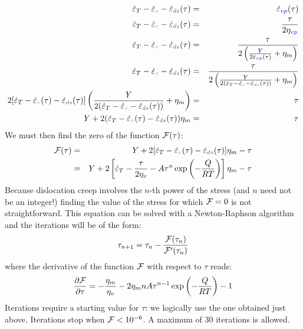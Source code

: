 \begin{enumerate}
\begin{eqnarray}
\dot\varepsilon_T 
-\dot{\varepsilon}_{\color{orange}v} 
-\dot{\varepsilon}_{\color{OliveGreen}ds}(\tau) 
&=& \dot\varepsilon_{\color{blue}vp}(\tau)  \nonumber\\
\dot\varepsilon_T 
-\dot{\varepsilon}_{\color{orange}v} 
-\dot{\varepsilon}_{\color{OliveGreen}ds}(\tau) 
&=& \frac{\tau}{2 \eta_{\color{blue}vp}}  \nn\\
\dot\varepsilon_T 
-\dot{\varepsilon}_{\color{orange}v} 
-\dot{\varepsilon}_{\color{OliveGreen}ds}(\tau) 
&=& \frac{\tau}{2 \left( \frac{Y}{2\dot\varepsilon_{\color{blue}vp}(\tau)} + \eta_m  \right)} 
\nonumber\\
\dot\varepsilon_T 
-\dot{\varepsilon}_{\color{orange}v} 
-\dot{\varepsilon}_{\color{OliveGreen}ds}(\tau) 
&=&
\frac{\tau}{2 \left( \frac{Y}{2 (
\dot\varepsilon_T 
-\dot{\varepsilon}_{\color{orange}v}   
-\dot{\varepsilon}_{\color{OliveGreen}ds}(\tau)  )} + \eta_m  \right)} \nonumber 
\\
2 [
\dot\varepsilon_T 
-\dot{\varepsilon}_{\color{orange}v}(\tau) 
-\dot{\varepsilon}_{\color{OliveGreen}ds}(\tau)
]
\left( \frac{Y}{2 (
\dot\varepsilon_T 
-\dot{\varepsilon}_{\color{orange}v} 
-\dot{\varepsilon}_{\color{OliveGreen}ds}(\tau) )} + \eta_m  \right) &=& \tau 
\nonumber\\
Y + 2 (
\dot\varepsilon_T 
-\dot{\varepsilon}_{\color{orange}v}(\tau)  
-\dot{\varepsilon}_{\color{OliveGreen}ds}(\tau) ) \eta_m  &=& \tau \nonumber 
\end{eqnarray}
We must then find the zero of the function ${\cal F}(\tau)$: 
\begin{eqnarray}
{\cal F}(\tau) 
&=& Y + 2 [
\dot\varepsilon_T 
-\dot{\varepsilon}_{\color{orange}v}(\tau)   
-\dot{\varepsilon}_{\color{OliveGreen}ds}(\tau) 
]\eta_m -\tau \nonumber\\
&=& Y + 2 \left[ 
\dot\varepsilon_T -\frac{\tau}{2\eta_v} -A \tau^n \exp \left(-\frac{Q}{RT}\right) 
\right]\eta_m -\tau \nn
\end{eqnarray}
Because dislocation creep involves the $n$-th power of the stress (and $n$ need not be an integer!) 
finding the value of the stress for which ${\cal F}=0$ is not straightforward.
This equation can be solved with a Newton-Raphson algorithm
and the iterations will be of the form:
\[
\tau_{n+1} = \tau_n - \frac{{\cal F}(\tau_n)}{{\cal F}'(\tau_n)}
\]
where the derivative of the function ${\cal F}$ with respect to $\tau$ reads:
\begin{eqnarray}
\frac{\partial {\cal F}}{\partial \tau} 
= -\frac{\eta_m}{\eta_v}-2 \eta_m n A \tau^{n-1} \exp \left(-\frac{Q}{RT}\right) -1 
\end{eqnarray}
Iterations require a starting value for $\tau$: we logically use the one obtained just 
above. Iterations stop when ${\cal F}<10^{-6}$.  
A maximum of 30 iterations is allowed.


\end{enumerate}
